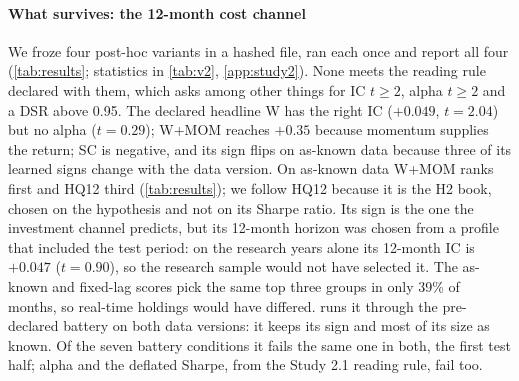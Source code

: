 \paragraph{What survives: the 12-month cost channel}\label{sec:survives} We froze four post-hoc variants in a hashed file, ran each once and report all four (\cref{tab:results}; statistics in \cref{tab:v2}, \cref{app:study2}). None meets the reading rule declared with them, which asks among other things for IC $t\ge2$, alpha $t\ge2$ and a DSR above 0.95. %
The declared headline W has the right IC ($+0.049$, $t=2.04$) but no alpha ($t=0.29$); W+MOM reaches $+0.35$ because momentum supplies the return; SC is negative, and its sign flips on as-known data because three of its learned signs change with the data version. On as-known data W+MOM ranks first and HQ12 third (\cref{tab:results}); we follow HQ12 because it is the H2 book, chosen on the hypothesis and not on its Sharpe ratio. %
Its sign is the one the investment channel predicts, but its 12-month horizon was chosen from a profile that included the test period: on the research years alone its 12-month IC is $+0.047$ ($t=0.90$), so the research sample would not have selected it. %
The as-known and fixed-lag scores pick the same top three groups in only 39\% of months, so real-time holdings would have differed. %
 runs it through the pre-declared battery on both data versions: it keeps its sign and most of its size as known. Of the seven battery conditions it fails the same one in both, the first test half; alpha and the deflated Sharpe, from the Study 2.1 reading rule, fail too.

